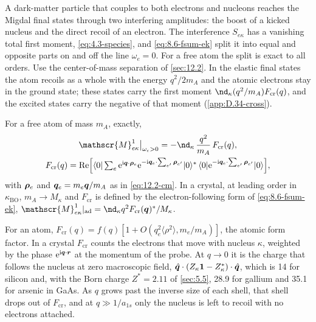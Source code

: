 A dark-matter particle that couples to both electrons and nucleons reaches the Migdal final states through two interfering amplitudes: the boost of a kicked nucleus and the direct recoil of an electron. The interference $S_{e\kappa}$ has a vanishing total first moment, \cref{eq:4.3-species}, and \cref{eq:8.6-fsum-ek} split it into equal and opposite parts on and off the line $\omega_e = 0$. For a free atom the split is exact to all orders. Use the center-of-mass separation of \cref{sec:12.2}. In the elastic final states the atom recoils as a whole with the energy $q^2/2m_A$ and the atomic electrons stay in the ground state; these states carry the first moment $\nd_\kappa(q^2/m_A)F_{\mathrm{cr}}(q)$, and the excited states carry the negative of that moment (\cref{app:D.34-cross}).
\begin{keyresult}
For a free atom of mass $m_A$, exactly,
\begin{equation}
  \begin{gathered}
  \mathscr{M}^1_{e\kappa}\big|_{\omega_e > 0} = -\nd_\kappa\,\frac{q^2}{m_A}\,F_{\mathrm{cr}}(q) , \\
  F_{\mathrm{cr}}(q) = \Real\Bigl[\langle0|\textstyle\sum_e\ee^{\ii\vect{q}\cdot\vect{\rho}_e}\ee^{-\ii\vect{q}_e\cdot\sum_{e'}\vect{\rho}_{e'}}|0\rangle^*\,\langle0|\ee^{-\ii\vect{q}_e\cdot\sum_{e'}\vect{\rho}_{e'}}|0\rangle\Bigr] ,
  \end{gathered}
  \label{eq:12.5-cross}
\end{equation}
with $\bm{\rho}_e$ and $\bm{q}_e = m_e\bm{q}/m_A$ as in \cref{eq:12.2-cm}. In a crystal, at leading order in $\kappa_{\mathrm{BO}}$, $m_A \to M_\kappa$ and $F_{\mathrm{cr}}$ is defined by the electron-following form of \cref{eq:8.6-fsum-ek}, $\mathscr{M}^1_{e\kappa}|_{\mathrm{ad}} = \nd_\kappa q^2F_{\mathrm{cr}}(\vect{q})^*/M_\kappa$.
\end{keyresult}
\noindent For an atom, $F_{\mathrm{cr}}(q) = f(q)[1 + O(q_e^2\langle\rho^2\rangle, m_e/m_A)]$, the atomic form factor. In a crystal $F_{\mathrm{cr}}$ counts the electrons that move with nucleus $\kappa$, weighted by the phase $\mathrm{e}^{\mathrm{i}\bm{q}\cdot\bm{r}}$ at the momentum of the probe. At $q \to 0$ it is the charge that follows the nucleus at zero macroscopic field, $\hat{\bm{q}}\cdot(Z_\kappa\mathbf{1} - Z^*_\kappa)\cdot\hat{\bm{q}}$, which is 14 for silicon and, with the Born charge $Z^* = 2.11$ of \cref{sec:5.5}, 28.9 for gallium and 35.1 for arsenic in GaAs. As $q$ grows past the inverse size of each shell, that shell drops out of $F_{\mathrm{cr}}$, and at $q \gg 1/a_{1s}$ only the nucleus is left to recoil with no electrons attached.


